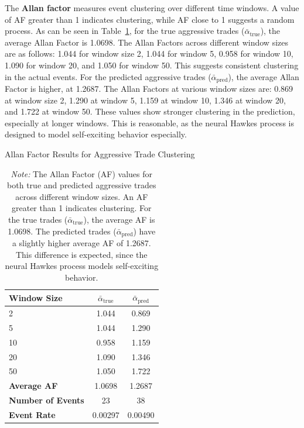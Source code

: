The \textbf{Allan factor} measures event clustering over different time windows. A value of AF greater than 1 indicates clustering, while AF close to 1 suggests a random process. As can be seen in Table~\ref{tb:allan-factor}, for the true aggressive trades ($\bar{\alpha}_\text{true}$), the average Allan Factor is 1.0698. The Allan Factors across different window sizes are as follows: 1.044 for window size 2, 1.044 for window 5, 0.958 for window 10, 1.090 for window 20, and 1.050 for window 50. This suggests consistent clustering in the actual events. For the predicted aggressive trades ($\bar{\alpha}_\text{pred}$), the average Allan Factor is higher, at 1.2687. The Allan Factors at various window sizes are: 0.869 at window size 2, 1.290 at window 5, 1.159 at window 10, 1.346 at window 20, and 1.722 at window 50. These values show stronger clustering in the prediction, especially at longer windows. This is reasonable, as the neural Hawkes process is designed to model self-exciting behavior especially.

\begin{table}[H]
    \centering
    \caption{Allan Factor Results for Aggressive Trade Clustering}
    \caption*{\textit{Note:} The Allan Factor (AF) values for both true and predicted aggressive trades across different window sizes. An AF greater than 1 indicates clustering. For the true trades ($\bar{\alpha}_\text{true}$), the average AF is 1.0698. The predicted trades ($\bar{\alpha}_\text{pred}$) have a slightly higher average AF of 1.2687. This difference is expected, since the neural Hawkes process models self-exciting behavior.}
    \label{tb:allan-factor}
    \begin{tabular}{lcc}
    \toprule
    \textbf{Window Size} & $\bar{\alpha}_\text{true}$ & $\bar{\alpha}_\text{pred}$\\
    \midrule
    2   & 1.044 & 0.869 \\
    5   & 1.044 & 1.290 \\
    10  & 0.958 & 1.159 \\
    20  & 1.090 & 1.346 \\
    50  & 1.050 & 1.722 \\
    \midrule
    \textbf{Average AF} & 1.0698 & 1.2687 \\
    \textbf{Number of Events} & 23 & 38 \\
    \textbf{Event Rate} & 0.00297 & 0.00490 \\
    \bottomrule
    \end{tabular}
\end{table}

